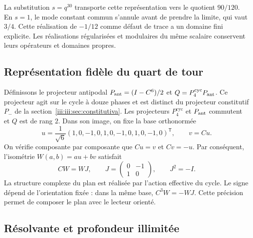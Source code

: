 La substitution $s=q^{30}$ transporte cette représentation vers le quotient
$90/120$. En $s=1$, le mode constant commun s’annule avant de prendre la
limite, qui vaut $3/4$. Cette réalisation de $-1/12$ comme défaut de trace
a un domaine fini explicite. Les réalisations régularisées et
modulaires du même scalaire conservent leurs opérateurs et domaines propres.

\subsection{Représentation fidèle du quart de tour}

Définissons le projecteur antipodal $P_{\rm ant}=(I-C^6)/2$ et
$Q=P_4^{\mathrm{cyc}}P_{\rm ant}$. Ce projecteur agit sur le cycle à douze phases et est
distinct du projecteur constitutif $P_-$ de la section~\ref{iii:iii:sec:constitutiva}.
Les projecteurs $P_4^{\mathrm{cyc}}$ et $P_{\rm ant}$ commutent et
$Q$ est de rang $2$. Dans son image, on fixe la base orthonormée
\begin{equation}
 u=\frac1{\sqrt6}(1,0,-1,0,1,0,-1,0,1,0,-1,0)^{\mathsf T},
 \qquad v=Cu.
 \label{iii:iii:eq:uv}
\end{equation}
On vérifie composante par composante que $Cu=v$ et $Cv=-u$. Par conséquent,
l’isométrie $W(a,b)=au+bv$ satisfait
\begin{equation}
 CW=WJ,\qquad
 J=\begin{pmatrix}0&-1\\1&0\end{pmatrix},\qquad J^2=-I.
 \label{iii:iii:eq:quarter-intertwiner}
\end{equation}
La structure complexe du plan est réalisée par l’action effective du
cycle. Le signe dépend de l’orientation fixée : dans la même base,
$C^3W=-WJ$. Cette précision permet de composer le plan avec le lecteur orienté.

\subsection{Résolvante et profondeur illimitée}

